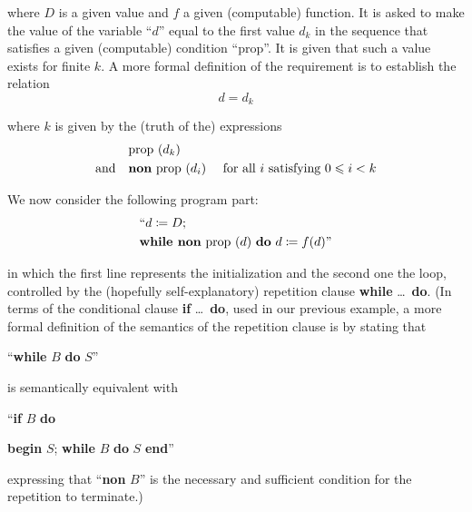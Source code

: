 \noindent
where $D$ is a given value and $f$ a given (computable) function. It is asked to make the value of the variable ``$d$'' equal to the first value $d_k$ in the sequence that satisfies a given (computable) condition ``prop''. It is given that such a value exists for finite $k$. A more formal definition of the requirement is to establish the relation
\begin{equation}
	\label{eq:induction-dk}
	d=d_k
\end{equation}

\noindent
where $k$ is given by the (truth of the) expressions
\begin{eqnarray}
	\label{eq:prod-dk}
	&\text{prop } (d_k)& \\
	\label{eq:non-prop-i}
	\text{and}\quad &\text{\textbf{non} prop }(d_i) &\text{ for all } i \text{ satisfying } 0 \leqslant i < k
\end{eqnarray}

We now consider the following program part:
\begin{equation}
	\label{eq:program-while-non-prop}
	\begin{split}
		&\text{``}d \coloneq D;\\
		&\text{\textbf{while non} prop }(d) \text{ \textbf{do} } d \coloneq f(d)\text{''}
	\end{split}
\end{equation}

\noindent
in which the first line represents the initialization and the second one the loop, controlled by the (hopefully self-explanatory) repetition clause \textbf{while} \dots\ \textbf{do}. (In terms of the conditional clause \textbf{if} \dots\ \textbf{do}, used in our previous example, a more formal definition of the semantics of the repetition clause is by stating
that
\medskip

{
	\setlength{\parindent}{8em}
	\hspace{-.5em}``\textbf{while} $B$ \textbf{do} $S$''
}
\medskip

\noindent
is semantically equivalent with
\medskip

{
	\setlength{\parindent}{8em}
	\hspace{-.5em}``\textbf{if} $B$ \textbf{do}
	
	\quad \textbf{begin} $S$; \textbf{while} $B$ \textbf{do} $S$ \textbf{end}''
}
\medskip

\noindent
expressing that ``\textbf{non} $B$'' is the necessary and sufficient condition for the repetition to terminate.)

